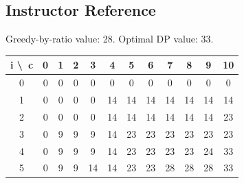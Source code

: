 \documentclass[11pt]{article}
\begin{document}
\subsection*{Instructor Reference}
Greedy-by-ratio value: 28. Optimal DP value: 33.
\begin{center}
\begin{tabular}{|c|c|c|c|c|c|c|c|c|c|c|c|}
\hline
 i \textbackslash\ c & 0 & 1 & 2 & 3 & 4 & 5 & 6 & 7 & 8 & 9 & 10 \\
\hline
 0 & 0 & 0 & 0 & 0 & 0 & 0 & 0 & 0 & 0 & 0 & 0 \\
\hline
 1 & 0 & 0 & 0 & 0 & 14 & 14 & 14 & 14 & 14 & 14 & 14 \\
\hline
 2 & 0 & 0 & 0 & 0 & 14 & 14 & 14 & 14 & 14 & 14 & 23 \\
\hline
 3 & 0 & 9 & 9 & 9 & 14 & 23 & 23 & 23 & 23 & 23 & 23 \\
\hline
 4 & 0 & 9 & 9 & 9 & 14 & 23 & 23 & 23 & 23 & 24 & 33 \\
\hline
 5 & 0 & 9 & 9 & 14 & 14 & 23 & 23 & 28 & 28 & 28 & 33 \\
\hline
\end{tabular}
\end{center}
\end{document}
